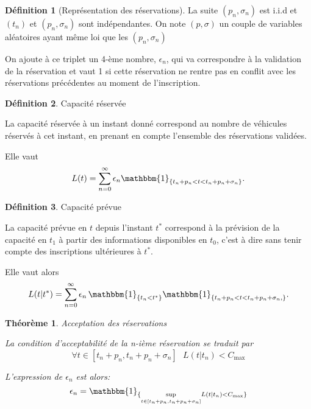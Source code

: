\documentclass[12pt,a4paper]{article}
\newcommand{\1}[1]{\mathbbm{1}_{\{#1\}} }
\newtheorem{theorem}{Théorème}
\theoremstyle{definition}
\newtheorem{definition}{Définition}
\begin{document}
{\begin{definition}[Représentation des réservations]
La suite $(p_n,\sigma_n)$ est i.i.d et $(t_n)$ et $(p_n,\sigma_n)$ sont indépendantes. 
On note $(p,\sigma)$ un couple de variables aléatoires ayant même loi que les  $(p_n,\sigma_n)$

On ajoute à ce triplet un 4-ème nombre, $\epsilon_n$, qui va correspondre à la validation de la réservation et vaut 1 si cette réservation ne rentre pas en conflit avec les réservations précédentes au moment de l'inscription.
\end{definition}

\begin{definition}{Capacité réservée}

La capacité réservée à un instant donné correspond au nombre de véhicules réservés à cet instant, en prenant en compte l'ensemble des réservations validées.

Elle vaut
\begin{equation}
L(t) = \sum_{n=0}^{\infty} \epsilon_n \mathbbm{1}_{\{t_n+p_n<t<t_n+p_n+\sigma_n\}}.
\end{equation}

\end{definition}



\begin{definition}{Capacité prévue}

La capacité prévue en $t$ depuis l'instant $t^{*}$ correspond à la prévision de la capacité en $t_1$ à partir des informations disponibles en $t_0$, c'est à dire sans tenir compte des inscriptions ultérieures à $t^*$.

Elle vaut alors
\begin{equation}
L(t|t^{*}) = \sum_{n=0}^{\infty} \epsilon_n\,\1{t_n<t^*}\mathbbm{1}_{\{t_n+p_n<t<t_n+p_n+\sigma_n,\}}.
\end{equation}

\end{definition}


\begin{theorem}{Acceptation des réservations}

La condition d'acceptabilité de la n-ième réservation se traduit par
\begin{equation}
\forall t \in [t_n+p_n,t_n+p_n+\sigma_n]\,\,\,\, L(t|t_n) < C_{\max}
\end{equation}

L'expression de $\epsilon_n$ est alors:
\begin{equation}
\epsilon_n = \1{\underset{t \in [t_n+p_n,t_n+p_n+\sigma_n]}{\sup} L(t|t_n) < C_{\max}}
\end{equation}
\end{theorem}

}
\end{document}
